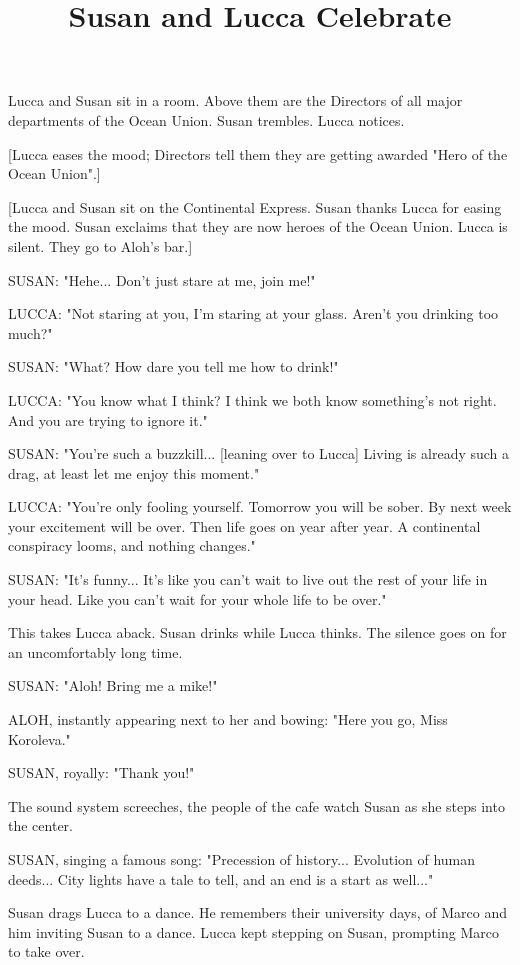 \documentclass[11pt]{article}
\begin{document}
\ttfamily
\title{Susan and Lucca Celebrate}
\maketitle


Lucca and Susan sit in a room. Above them are the Directors of all major departments of the Ocean Union. Susan trembles. Lucca notices.

[Lucca eases the mood; Directors tell them they are getting awarded "Hero of the Ocean Union".]

[Lucca and Susan sit on the Continental Express. Susan thanks Lucca for easing the mood. Susan exclaims that they are now heroes of the Ocean Union. Lucca is silent. They go to Aloh's bar.]

SUSAN: "Hehe... Don't just stare at me, join me!"

LUCCA: "Not staring at you, I'm staring at your glass. Aren't you drinking too much?"

SUSAN: "What? How dare you tell me how to drink!"

LUCCA: "You know what I think? I think we both know something's not right. And you are trying to ignore it."

SUSAN: "You're such a buzzkill... [leaning over to Lucca] Living is already such a drag, at least let me enjoy this moment."

LUCCA: "You're only fooling yourself. Tomorrow you will be sober. By next week your excitement will be over. Then life goes on year after year. A continental conspiracy looms, and nothing changes."

SUSAN: "It's funny... It's like you can't wait to live out the rest of your life in your head. Like you can't wait for your whole life to be over."

This takes Lucca aback. Susan drinks while Lucca thinks. The silence goes on for an uncomfortably long time.

SUSAN: "Aloh! Bring me a mike!"

ALOH, instantly appearing next to her and bowing: "Here you go, Miss Koroleva."

SUSAN, royally: "Thank you!"

The sound system screeches, the people of the cafe watch Susan as she steps into the center. 

SUSAN, singing a famous song: "Precession of history... Evolution of human deeds... City lights have a tale to tell, and an end is a start as well..."

Susan drags Lucca to a dance. He remembers their university days, of Marco and him inviting Susan to a dance. Lucca kept stepping on Susan, prompting Marco to take over. 
\end{document}
